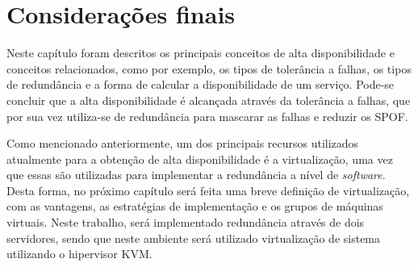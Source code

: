 \section{Considerações finais}

Neste capítulo foram descritos os principais conceitos de alta disponibilidade e conceitos relacionados, como por exemplo, os tipos de tolerância
a falhas, os tipos de redundância e a forma de calcular a disponibilidade de um serviço. Pode-se concluir que a alta 
disponibilidade é alcançada através da tolerância a falhas, que por sua vez utiliza-se de redundância para mascarar as falhas e reduzir 
os \ac{SPOF}. 

Como mencionado anteriormente, um dos principais recursos utilizados atualmente para a obtenção de alta disponibilidade é a virtualização, 
uma vez que essas são utilizadas para implementar a redundância a nível de \textit{software}. Desta forma, no próximo capítulo será feita 
uma breve definição de virtualização, com as vantagens, as estratégias de implementação e os grupos de máquinas virtuais.
Neste trabalho, será implementado redundância através de dois servidores, sendo que neste ambiente será utilizado virtualização de sistema 
utilizando o hipervisor \ac{KVM}.
